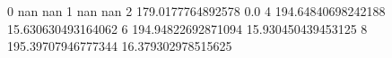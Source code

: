 0 nan nan
1 nan nan
2 179.0177764892578 0.0
4 194.64840698242188 15.630630493164062
6 194.94822692871094 15.930450439453125
8 195.39707946777344 16.379302978515625
